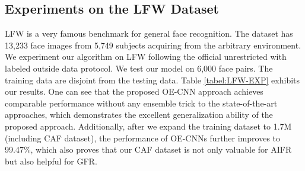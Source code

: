 \documentclass[runningheads]{llncs}
\begin{document}
\subsection{Experiments on the LFW Dataset}
LFW is a very famous benchmark for general face recognition. The dataset has 13,233 face images from 5,749 subjects acquiring from the arbitrary environment. We experiment our algorithm on LFW following the official unrestricted with labeled outside data protocol. We test our model on 6,000 face pairs. The training data are disjoint from the testing data. Table \ref{tabel:LFW-EXP} exhibits our results. One can see that the proposed OE-CNN approach achieves comparable performance without any ensemble trick to the state-of-the-art approaches, which demonstrates the excellent generalization ability of the proposed approach. Additionally, after we expand the training dataset to 1.7M (including CAF dataset), the performance of OE-CNNs further improves to 99.47\%, which also proves that our CAF dataset is not only valuable for AIFR but also helpful for GFR.  
\end{document}
